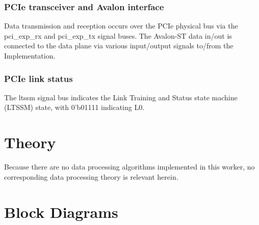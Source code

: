 \begin{flushleft}
	\subsubsection*{PCIe transceiver and Avalon interface}
	Data transmission and reception occurs over the PCIe physical bus via the pci\_exp\_rx and pci\_exp\_tx signal buses. The Avalon-ST data in/out is connected to the data plane via various input/output signals to/from the Implementation.
	\subsubsection*{PCIe link status}
	The ltssm signal bus indicates the Link Training and Status state machine (LTSSM) state, with 0'b01111 indicating L0.\medskip
\end{flushleft}
\pagebreak

\section*{Theory}
Because there are no data processing algorithms implemented in this worker, no corresponding data processing theory is relevant herein.

\section*{Block Diagrams}

